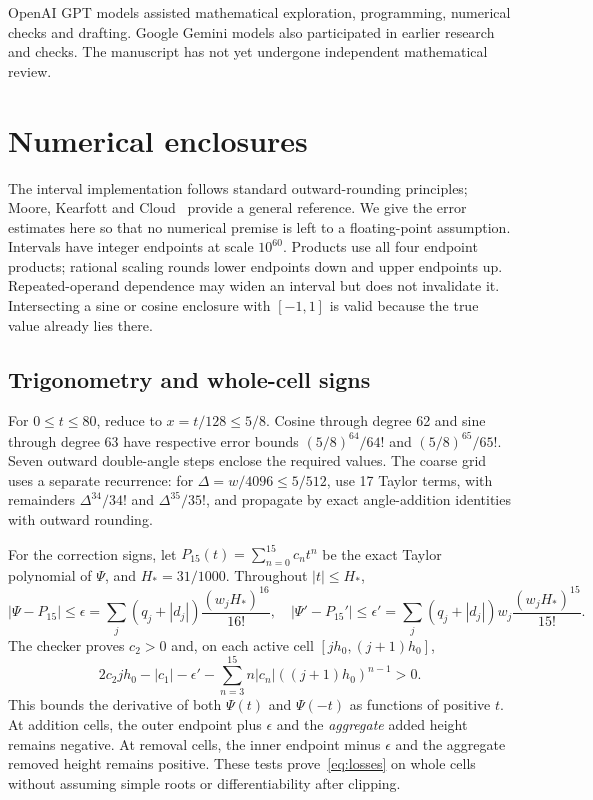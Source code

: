 \documentclass[10pt]{article}
\begin{document}
OpenAI GPT models assisted mathematical exploration, programming, numerical checks and drafting. Google Gemini models also participated in earlier research and checks.
The manuscript has not yet undergone independent mathematical review.

\appendix
\section{Numerical enclosures}\label{app:numerics}
The interval implementation follows standard outward-rounding principles; Moore, Kearfott and Cloud~\cite{Interval} provide a general reference. We give the error estimates here so that no numerical premise is left to a floating-point assumption.
Intervals have integer endpoints at scale $10^{60}$. Products use all four endpoint products; rational scaling rounds lower endpoints down and upper endpoints up. Repeated-operand dependence may widen an interval but does not invalidate it. Intersecting a sine or cosine enclosure with $[-1,1]$ is valid because the true value already lies there.

\subsection{Trigonometry and whole-cell signs}
For $0\leq t\leq80$, reduce to $x=t/128\leq5/8$.
Cosine through degree 62 and sine through degree 63 have respective error bounds
$(5/8)^{64}/64!$ and $(5/8)^{65}/65!$.
Seven outward double-angle steps enclose the required values.
The coarse grid uses a separate recurrence: for $\Delta=w/4096\leq5/512$, use 17 Taylor terms, with remainders $\Delta^{34}/34!$ and $\Delta^{35}/35!$, and propagate by exact angle-addition identities with outward rounding.

For the correction signs, let $P_{15}(t)=\sum_{n=0}^{15}c_nt^n$ be the exact Taylor polynomial of $\Psi$, and $H_*=31/1000$.
Throughout $|t|\leq H_*$,
\[
|\Psi-P_{15}|\leq\epsilon=\sum_j(q_j+|d_j|)\frac{(w_jH_*)^{16}}{16!},\quad
|\Psi'-P_{15}'|\leq\epsilon'=\sum_j(q_j+|d_j|)w_j\frac{(w_jH_*)^{15}}{15!}.
\]
The checker proves $c_2>0$ and, on each active cell $[jh_0,(j+1)h_0]$,
\[
2c_2jh_0-|c_1|-\epsilon'
 -\sum_{n=3}^{15}n|c_n|((j+1)h_0)^{n-1}>0.
\]
This bounds the derivative of both $\Psi(t)$ and $\Psi(-t)$ as functions of positive $t$.
At addition cells, the outer endpoint plus $\epsilon$ and the \emph{aggregate} added height remains negative.
At removal cells, the inner endpoint minus $\epsilon$ and the aggregate removed height remains positive.
These tests prove~\eqref{eq:losses} on whole cells without assuming simple roots or differentiability after clipping.
\end{document}
